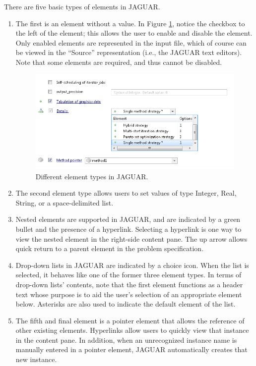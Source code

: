 There are five basic types of elements in JAGUAR.
\begin{enumerate}
\item The first is an element without a value.  In Figure
  \ref{fig:input:jag_graphical5}, notice the checkbox to the left of
  the element; this allows the user to enable and disable the element.
  Only enabled elements are represented in the input file, which of
  course can be viewed in the ``Source'' representation (i.e., the
  JAGUAR text editors).  Note that some elements are required, and
  thus cannot be disabled.
\begin{figure}
  \centering
  \includegraphics[scale=0.8]{images/2_1jag_graphical5}
  \caption{Different element types in JAGUAR.}
  \label{fig:input:jag_graphical5}
\end{figure}

\item The second element type allows users to set values of type
  Integer, Real, String, or a space-delimited list.

\item Nested elements are supported in JAGUAR, and are indicated by a
  green bullet and the presence of a hyperlink.  Selecting a hyperlink
  is one way to view the nested element in the right-side content
  pane.  The up arrow allows quick return to a parent element in the
  problem specification.

\item Drop-down lists in JAGUAR are indicated by a choice icon.  When
  the list is selected, it behaves like one of the former three
  element types.  In terms of drop-down lists' contents, note that the
  first element functions as a header text whose purpose is to aid the
  user's selection of an appropriate element below.  Asterisks are
  also used to indicate the default element of the list.

\item The fifth and final element is a pointer element that allows the
  reference of other existing elements.  Hyperlinks allow users to
  quickly view that instance in the content pane.  In addition, when
  an unrecognized instance name is manually entered in a pointer
  element, JAGUAR automatically creates that new instance.

\end{enumerate}

